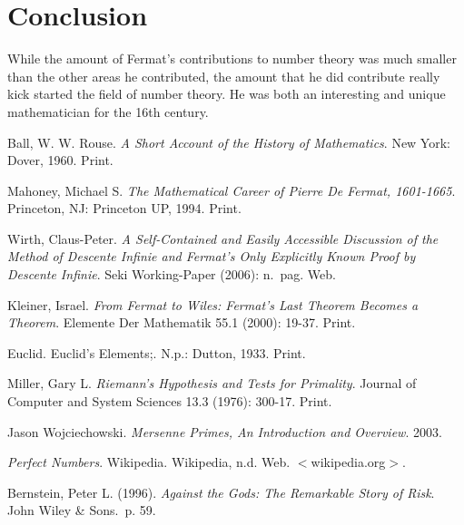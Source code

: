 \documentclass[11pt]{article}
\begin{document}
\section*{Conclusion}
While the amount of Fermat's contributions to number theory was much smaller than
the other areas he contributed, the amount that he did contribute really
kick started the field of number theory.
He was both an interesting and unique mathematician for the 16th century.


\begin{thebibliography}{9}
    Ball, W. W. Rouse. \emph{A Short Account of the History of Mathematics}. New York: Dover, 1960. Print.

    Mahoney, Michael S. \emph{The Mathematical Career of Pierre De Fermat, 1601-1665}. Princeton, NJ: Princeton UP, 1994. Print.

    Wirth, Claus-Peter.
    \emph{A Self-Contained and Easily Accessible Discussion of the Method of Descente Infinie and Fermat's Only Explicitly Known Proof by Descente Infinie}.
    Seki Working-Paper (2006): n.\ pag. Web.

    Kleiner, Israel.
    \emph{From Fermat to Wiles: Fermat's Last Theorem Becomes a Theorem}.
    Elemente Der Mathematik 55.1 (2000): 19-37. Print.

    Euclid. Euclid's Elements;. N.p.: Dutton, 1933. Print.

    Miller, Gary L.
    \emph{Riemann's Hypothesis and Tests for Primality}.
    Journal of Computer and System Sciences 13.3 (1976): 300-17. Print.

    Jason Wojciechowski.
    \emph{Mersenne Primes, An Introduction and Overview}. 2003.


    \emph{Perfect Numbers}. Wikipedia. Wikipedia, n.d. Web. $<$wikipedia.org$>$.

    Bernstein, Peter L. (1996).
    \emph{Against the Gods: The Remarkable Story of Risk}. John Wiley \& Sons.\ p. 59.



\end{thebibliography}
\end{document}
